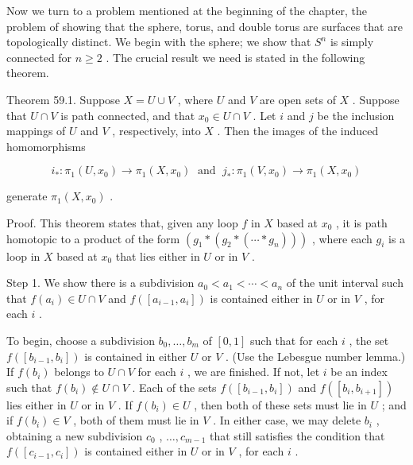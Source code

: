 \documentclass[10pt]{article}
\begin{document}
Now we turn to a problem mentioned at the beginning of the chapter, the problem of showing that the sphere, torus, and double torus are surfaces that are topologically distinct. We begin with the sphere; we show that \({S}^{n}\) is simply connected for \(n \geq  2\) . The crucial result we need is stated in the following theorem.

Theorem 59.1. Suppose \(X = U \cup  V\) , where \(U\) and \(V\) are open sets of \(X\) . Suppose that \(U \cap  V\) is path connected, and that \({x}_{0} \in  U \cap  V\) . Let \(i\) and \(j\) be the inclusion mappings of \(U\) and \(V\) , respectively, into \(X\) . Then the images of the induced homomorphisms

\[
{i}_{ * } : {\pi }_{1}\left( {U,{x}_{0}}\right)  \rightarrow  {\pi }_{1}\left( {X,{x}_{0}}\right) \;\text{ and }\;{j}_{ * } : {\pi }_{1}\left( {V,{x}_{0}}\right)  \rightarrow  {\pi }_{1}\left( {X,{x}_{0}}\right)
\]

generate \({\pi }_{1}\left( {X,{x}_{0}}\right)\) .

Proof. This theorem states that, given any loop \(f\) in \(X\) based at \({x}_{0}\) , it is path homotopic to a product of the form \(\left( {{g}_{1} * \left( {{g}_{2} * \left( {\cdots  * {g}_{n}}\right) }\right) }\right)\) , where each \({g}_{i}\) is a loop in \(X\) based at \({x}_{0}\) that lies either in \(U\) or in \(V\) .

Step 1. We show there is a subdivision \({a}_{0} < {a}_{1} < \cdots  < {a}_{n}\) of the unit interval such that \(f\left( {a}_{i}\right)  \in  U \cap  V\) and \(f\left( \left\lbrack  {{a}_{i - 1},{a}_{i}}\right\rbrack  \right)\) is contained either in \(U\) or in \(V\) , for each \(i\) .

To begin, choose a subdivision \({b}_{0},\ldots ,{b}_{m}\) of \(\left\lbrack  {0,1}\right\rbrack\) such that for each \(i\) , the set \(f\left( \left\lbrack  {{b}_{i - 1},{b}_{i}}\right\rbrack  \right)\) is contained in either \(U\) or \(V\) . (Use the Lebesgue number lemma.) If \(f\left( {b}_{i}\right)\) belongs to \(U \cap  V\) for each \(i\) , we are finished. If not, let \(i\) be an index such that \(f\left( {b}_{i}\right)  \notin  U \cap  V\) . Each of the sets \(f\left( \left\lbrack  {{b}_{i - 1},{b}_{i}}\right\rbrack  \right)\) and \(f\left( \left\lbrack  {{b}_{i},{b}_{i + 1}}\right\rbrack  \right)\) lies either in \(U\) or in \(V\) . If \(f\left( {b}_{i}\right)  \in  U\) , then both of these sets must lie in \(U\) ; and if \(f\left( {b}_{i}\right)  \in  V\) , both of them must lie in \(V\) . In either case, we may delete \({b}_{i}\) , obtaining a new subdivision \({c}_{0}\) , \(\ldots ,{c}_{m - 1}\) that still satisfies the condition that \(f\left( \left\lbrack  {{c}_{i - 1},{c}_{i}}\right\rbrack  \right)\) is contained either in \(U\) or in \(V\) , for each \(i\) .
\end{document}
